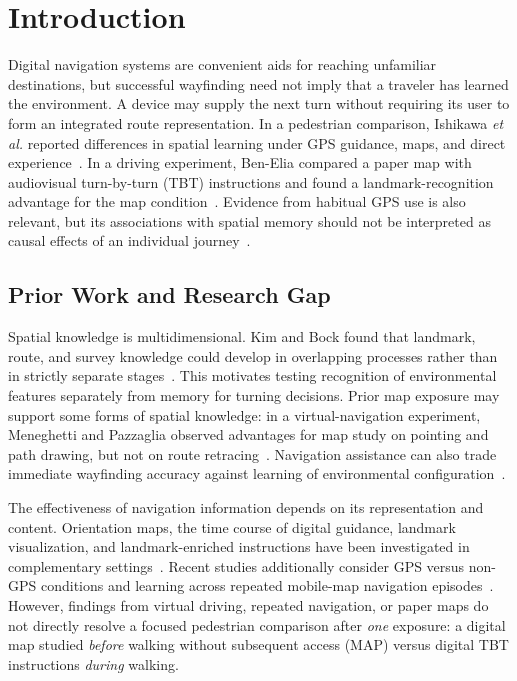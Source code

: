 \section{Introduction}\label{sec:intro}
Digital navigation systems are convenient aids for reaching unfamiliar destinations, but successful wayfinding need not imply that a traveler has learned the environment. A device may supply the next turn without requiring its user to form an integrated route representation. In a pedestrian comparison, Ishikawa \emph{et al.} reported differences in spatial learning under GPS guidance, maps, and direct experience~\cite{ishikawa_wayfinding_2008}. In a driving experiment, Ben-Elia compared a paper map with audiovisual turn-by-turn (TBT) instructions and found a landmark-recognition advantage for the map condition~\cite{ben-elia_exploratory_2021}. Evidence from habitual GPS use is also relevant, but its associations with spatial memory should not be interpreted as causal effects of an individual journey~\cite{dahmani_habitual_2020,topete_how_2024}.

\subsection{Prior Work and Research Gap}
Spatial knowledge is multidimensional. Kim and Bock found that landmark, route, and survey knowledge could develop in overlapping processes rather than in strictly separate stages~\cite{kim_landmark_2021}. This motivates testing recognition of environmental features separately from memory for turning decisions. Prior map exposure may support some forms of spatial knowledge: in a virtual-navigation experiment, Meneghetti and Pazzaglia observed advantages for map study on pointing and path drawing, but not on route retracing~\cite{meneghetti_navigating_2021}. Navigation assistance can also trade immediate wayfinding accuracy against learning of environmental configuration~\cite{munzer_navigation_2012}.

The effectiveness of navigation information depends on its representation and content. Orientation maps, the time course of digital guidance, landmark visualization, and landmark-enriched instructions have been investigated in complementary settings~\cite{lowen_spatial_2019,zhao_time_2023,cheng_effect_2022,wunderlich_landmark_2023}. Recent studies additionally consider GPS versus non-GPS conditions and learning across repeated mobile-map navigation episodes~\cite{al-srogy_spatial_2025,ying_mobile_2026}. However, findings from virtual driving, repeated navigation, or paper maps do not directly resolve a focused pedestrian comparison after \emph{one} exposure: a digital map studied \emph{before} walking without subsequent access (MAP) versus digital TBT instructions \emph{during} walking.

